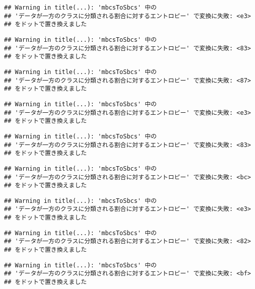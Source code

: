 \documentclass[
]{article}
\begin{document}
\begin{verbatim}
## Warning in title(...): 'mbcsToSbcs' 中の
## 'データが一方のクラスに分類される割合に対するエントロピー' で変換に失敗: <e3>
## をドットで置き換えました
\end{verbatim}

\begin{verbatim}
## Warning in title(...): 'mbcsToSbcs' 中の
## 'データが一方のクラスに分類される割合に対するエントロピー' で変換に失敗: <83>
## をドットで置き換えました
\end{verbatim}

\begin{verbatim}
## Warning in title(...): 'mbcsToSbcs' 中の
## 'データが一方のクラスに分類される割合に対するエントロピー' で変換に失敗: <87>
## をドットで置き換えました
\end{verbatim}

\begin{verbatim}
## Warning in title(...): 'mbcsToSbcs' 中の
## 'データが一方のクラスに分類される割合に対するエントロピー' で変換に失敗: <e3>
## をドットで置き換えました
\end{verbatim}

\begin{verbatim}
## Warning in title(...): 'mbcsToSbcs' 中の
## 'データが一方のクラスに分類される割合に対するエントロピー' で変換に失敗: <83>
## をドットで置き換えました
\end{verbatim}

\begin{verbatim}
## Warning in title(...): 'mbcsToSbcs' 中の
## 'データが一方のクラスに分類される割合に対するエントロピー' で変換に失敗: <bc>
## をドットで置き換えました
\end{verbatim}

\begin{verbatim}
## Warning in title(...): 'mbcsToSbcs' 中の
## 'データが一方のクラスに分類される割合に対するエントロピー' で変換に失敗: <e3>
## をドットで置き換えました
\end{verbatim}

\begin{verbatim}
## Warning in title(...): 'mbcsToSbcs' 中の
## 'データが一方のクラスに分類される割合に対するエントロピー' で変換に失敗: <82>
## をドットで置き換えました
\end{verbatim}

\begin{verbatim}
## Warning in title(...): 'mbcsToSbcs' 中の
## 'データが一方のクラスに分類される割合に対するエントロピー' で変換に失敗: <bf>
## をドットで置き換えました
\end{verbatim}
\end{document}
